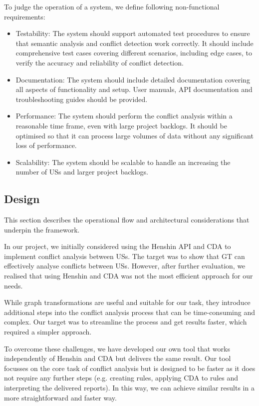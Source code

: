 To judge the operation of a system, we define following non-functional requirements:
\begin{itemize}
	\item Testability: The system should support automated test procedures to ensure that semantic analysis and conflict detection work correctly. It should include comprehensive test cases covering different scenarios, including edge cases, to verify the accuracy and reliability of conflict detection.
	
	\item Documentation: The system should include detailed documentation covering all aspects of functionality and setup. User manuals, API documentation and troubleshooting guides should be provided. 
	
	\item Performance: The system should perform the conflict analysis within a reasonable time frame, even with large project backlogs. It should be optimised so that it can process large volumes of data without any significant loss of performance.
	
	\item Scalability: The system should be scalable to handle an increasing the number of USs and larger project backlogs.
		
\end{itemize}

\subsection{Design}\label{conflict_desing}
This section describes the operational flow and architectural considerations that underpin the framework.

In our project, we initially considered using the Henshin API and CDA to implement conflict analysis between USs. The target was to show that GT can effectively analyse conflicts between USs. However, after further evaluation, we realised that using Henshin and CDA was not the most efficient approach for our needs.

While graph transformations are useful and suitable for our task, they introduce additional steps into the conflict analysis process that can be time-consuming and complex. Our target was to streamline the process and get results faster, which required a simpler approach.

To overcome these challenges, we have developed our own tool that works independently of Henshin and CDA but delivers the same result. Our tool focusses on the core task of conflict analysis but is designed to be faster as it does not require any further steps (e.g. creating rules, applying CDA to rules and interpreting the delivered reports). In this way, we can achieve similar results in a more straightforward and faster way.

